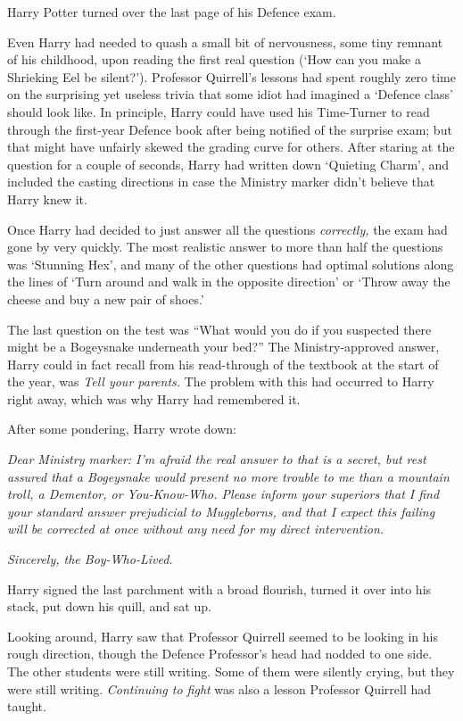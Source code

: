 \later

Harry Potter turned over the last page of his Defence exam.

Even Harry had needed to quash a small bit of nervousness, some tiny remnant of
his childhood, upon reading the first real question (‘How can you make a
Shrieking Eel be silent?’). Professor Quirrell’s lessons had spent roughly zero
time on the surprising yet useless trivia that some idiot had imagined a
‘Defence class’ should look like. In principle, Harry could have used his
Time-Turner to read through the first-year Defence book after being notified of
the surprise exam; but that might have unfairly skewed the grading curve for
others. After staring at the question for a couple of seconds, Harry had
written down ‘Quieting Charm’, and included the casting directions in case the
Ministry marker didn’t believe that Harry knew it.

Once Harry had decided to just answer all the questions \emph{correctly,} the
exam had gone by very quickly. The most realistic answer to more than half the
questions was ‘Stunning Hex’, and many of the other questions had optimal
solutions along the lines of ‘Turn around and walk in the opposite direction’
or ‘Throw away the cheese and buy a new pair of shoes.’

The last question on the test was “What would you do if you suspected there
might be a Bogeysnake underneath your bed?” The Ministry-approved answer, Harry
could in fact recall from his read-through of the textbook at the start of the
year, was \emph{Tell your parents.} The problem with this had occurred to Harry
right away, which was why Harry had remembered it.

After some pondering, Harry wrote down:

\emph{Dear Ministry marker: I’m afraid the real answer to that is a secret, but
rest assured that a Bogeysnake would present no more trouble to me than a
mountain troll, a Dementor, or You-Know-Who. Please inform your superiors that
I find your standard answer prejudicial to Muggleborns, and that I expect this
failing will be corrected at once without any need for my direct intervention.}

\emph{Sincerely, the Boy-Who-Lived.}

Harry signed the last parchment with a broad flourish, turned it over into his
stack, put down his quill, and sat up.

Looking around, Harry saw that Professor Quirrell seemed to be looking in his
rough direction, though the Defence Professor’s head had nodded to one side.
The other students were still writing. Some of them were silently crying, but
they were still writing. \emph{Continuing to fight} was also a lesson Professor
Quirrell had taught.

